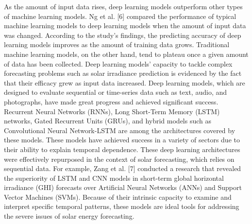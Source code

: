 \documentclass[a4paper,fleqn]{cas-sc}
\begin{document}
As the amount of input data rises, deep learning models outperform other types of machine learning models. Ng et al. [6] compared the performance of typical machine learning models to deep learning models when the amount of input data was changed. According to the study's findings, the predicting accuracy of deep learning models improves as the amount of training data grows. Traditional machine learning models, on the other hand, tend to plateau once a given amount of data has been collected. Deep learning models' capacity to tackle complex forecasting problems such as solar irradiance prediction is evidenced by the fact that their efficacy grew as input data increased. Deep learning models, which are designed to evaluate sequential or time-series data such as text, audio, and photographs, have made great progress and achieved significant success. Recurrent Neural Networks (RNNs), Long Short-Term Memory (LSTM) networks, Gated Recurrent Units (GRUs), and hybrid models such as Convolutional Neural Network-LSTM are among the architectures covered by these models. These models have achieved success in a variety of sectors due to their ability to explain temporal dependence.
These deep learning architectures were effectively repurposed in the context of solar forecasting, which relies on sequential data. For example, Zang et al. [7] conducted a research that revealed the superiority of LSTM and CNN models in short-term global horizontal irradiance (GHI) forecasts over Artificial Neural Networks (ANNs) and Support Vector Machines (SVMs). Because of their intrinsic capacity to examine and interpret specific temporal patterns, these models are ideal tools for addressing the severe issues of solar energy forecasting.
\end{document}
